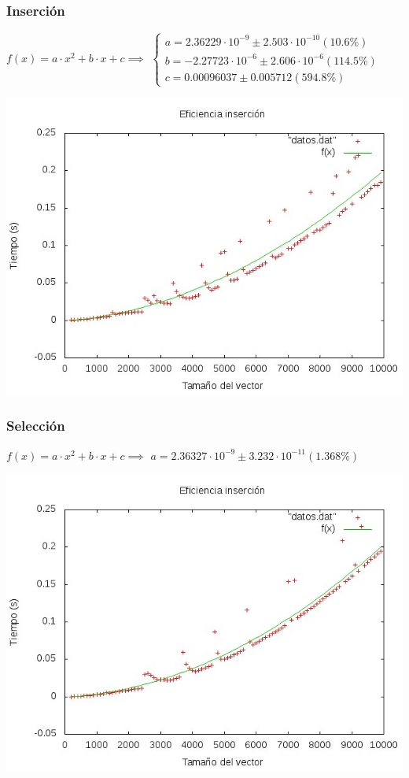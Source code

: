 \documentclass[11pt,spanish]{article} %
\begin{document}
\subsubsection{Inserci\'on} %
$f(x) = a\cdot x^2 + b\cdot x + c \implies$
$\left\{ \begin{array}{c}
a               = 2.36229\cdot 10^{-9}      \pm 2.503\cdot 10^{-10}    (10.6\%) \\
b               = -2.27723\cdot 10^{-6}     \pm 2.606\cdot 10^{-6}    (114.5\%) \\
c               = 0.00096037       \pm 0.005712     (594.8\%)
\end{array}\right.$

\begin{center}
\includegraphics[scale=0.55]{../Graficas/Insercion/insercionO0_ruben.jpeg}
\end{center}

\newpage
\subsubsection{Selecci\'on}
$f(x) = a\cdot x^2 + b\cdot x + c \implies$
$ a               = 2.36327\cdot 10^{-9}      \pm 3.232\cdot 10^{-11}    (1.368\%) $
\begin{center}
\includegraphics[scale=0.55]{../Graficas/Seleccion/seleccionO0_ruben.jpeg}
\end{center}
\end{document}

